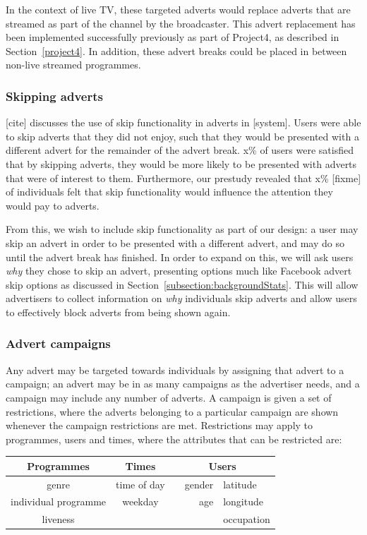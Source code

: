 	In the context of live TV, these targeted adverts would replace adverts that are streamed as part of the channel by the broadcaster. This advert replacement has been implemented successfully previously as part of Project4, as described in Section~\ref{project4}. In addition, these advert breaks could be placed in between non-live streamed programmes.

	\subsubsection{Skipping adverts}

	[cite] discusses the use of skip functionality in adverts in [system]. Users were able to skip adverts that they did not enjoy, such that they would be presented with a different advert for the remainder of the advert break. x\% of users were satisfied that by skipping adverts, they would be more likely to be presented with adverts that were of interest to them. Furthermore, our prestudy revealed that x\% [fixme] of individuals felt that skip functionality would influence the attention they would pay to adverts. 

	From this, we wish to include skip functionality as part of our design: a user may skip an advert in order to be presented with a different advert, and may do so until the advert break has finished. In order to expand on this, we will ask users \textit{why} they chose to skip an advert, presenting options much like Facebook advert skip options as discussed in Section~\ref{subsection:backgroundStats}. This will allow advertisers to collect information on \textit{why} individuals skip adverts and allow users to effectively block adverts from being shown again. 

	\subsubsection{Advert campaigns}

	Any advert may be targeted towards individuals by assigning that advert to a campaign; an advert may be in as many campaigns as the advertiser needs, and a campaign may include any number of adverts. A campaign is given a set of restrictions, where the adverts belonging to a particular campaign are shown whenever the campaign restrictions are met. Restrictions may apply to programmes, users and times, where the attributes that can be restricted are:

	\begin{center}
		\begin{tabular}{c c r l}
			\toprule
			\textbf{Programmes} & \textbf{Times} & \multicolumn{2}{c}{\textbf{Users}} \\
			\midrule
			genre & time of day & ~~gender & latitude \\ %
			individual programme & weekday & age & longitude \\
			liveness & & &  occupation \\
			\bottomrule
		\end{tabular}
	\end{center}

